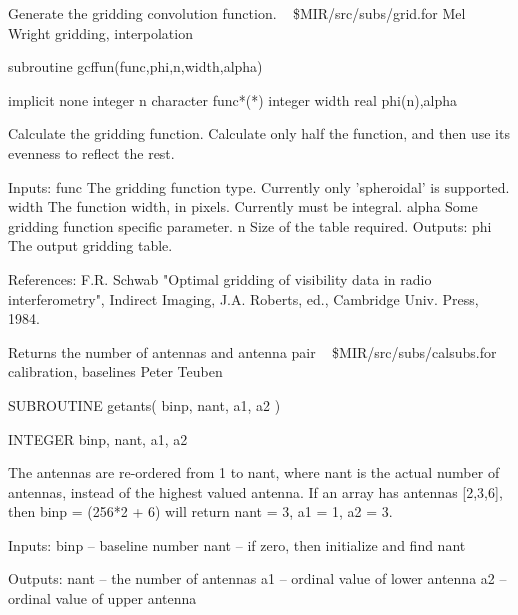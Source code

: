 %
\noindent Generate the gridding convolution function.
\newline \ 
\newline {} \$MIR/src/subs/grid.for
\newline {} Mel Wright
\newline {} gridding, interpolation
\par{\tenpoint
{\eightpoint\begintt
        subroutine gcffun(func,phi,n,width,alpha)

        implicit none
        integer n
        character func*(*)
        integer width
        real phi(n),alpha

  Calculate the gridding function. Calculate only half the function, and
  then use its evenness to reflect the rest.

  Inputs:
    func       The gridding function type. Currently only 'spheroidal'
               is supported.
    width      The function width, in pixels. Currently must be integral.
    alpha      Some gridding function specific parameter.
    n          Size of the table required.
  Outputs:
    phi        The output gridding table.

  References:
    F.R. Schwab "Optimal gridding of visibility data in radio interferometry",
      Indirect Imaging, J.A. Roberts, ed., Cambridge Univ. Press, 1984.
\endtt}
\par}
%
\noindent Returns the number of antennas and antenna pair
\newline \ 
\newline {} \$MIR/src/subs/calsubs.for
\newline {} calibration, baselines
\newline \abox{Responsible:} Peter Teuben
\par{\tenpoint
{\eightpoint\begintt
        SUBROUTINE getants( binp, nant, a1, a2 )

        INTEGER binp, nant, a1, a2

  The antennas are re-ordered from 1 to nant, where nant is the
  actual number of antennas, instead of the highest valued antenna.
  If an array has antennas [2,3,6], then binp = (256*2 + 6) will
  return nant = 3, a1 = 1, a2 = 3.

  Inputs:
       binp  -- baseline number
       nant -- if zero, then initialize and find nant

  Outputs:
       nant -- the number of antennas
       a1    -- ordinal value of lower antenna
       a2    -- ordinal value of upper antenna
\endtt}
\par}
